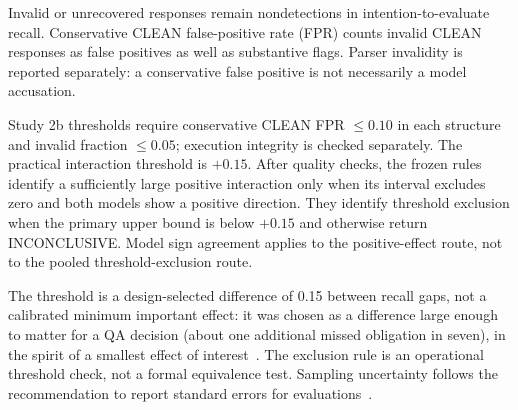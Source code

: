 \documentclass{ieeeaccess}
\begin{document}
Invalid or unrecovered responses remain nondetections in intention-to-evaluate recall. Conservative CLEAN false-positive rate (FPR) counts invalid CLEAN responses as false positives as well as substantive flags. Parser invalidity is reported separately: a conservative false positive is not necessarily a model accusation.

Study 2b thresholds require conservative CLEAN FPR $\leq0.10$ in each structure and invalid fraction $\leq0.05$; execution integrity is checked separately. The practical interaction threshold is $+0.15$. After quality checks, the frozen rules identify a sufficiently large positive interaction only when its interval excludes zero and both models show a positive direction. They identify threshold exclusion when the primary upper bound is below $+0.15$ and otherwise return INCONCLUSIVE. Model sign agreement applies to the positive-effect route, not to the pooled threshold-exclusion route.

The threshold is a design-selected difference of 0.15 between recall gaps, not a calibrated minimum important effect: it was chosen as a difference large enough to matter for a QA decision (about one additional missed obligation in seven), in the spirit of a smallest effect of interest~\cite{lakens2017equivalence}. The exclusion rule is an operational threshold check, not a formal equivalence test. Sampling uncertainty follows the recommendation to report standard errors for evaluations~\cite{miller2024errorbars}.
\end{document}
